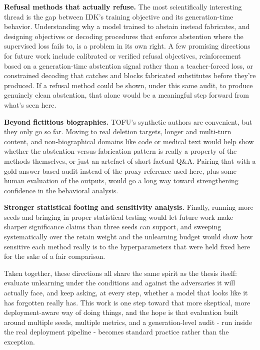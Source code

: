 \documentclass[a4paper,12pt]{report}
\begin{document}
\textbf{Refusal methods that actually refuse.} The most scientifically interesting thread is the gap between IDK's training objective and its generation-time behavior. Understanding why a model trained to abstain instead fabricates, and designing objectives or decoding procedures that enforce abstention where the supervised loss fails to, is a problem in its own right. A few promising directions for future work include calibrated or verified refusal objectives, reinforcement based on a generation-time abstention signal rather than a teacher-forced loss, or constrained decoding that catches and blocks fabricated substitutes before they're produced. If a refusal method could be shown, under this same audit, to produce genuinely clean abstention, that alone would be a meaningful step forward from what's seen here.

\textbf{Beyond fictitious biographies.} TOFU's synthetic authors are convenient, but they only go so far. Moving to real deletion targets, longer and multi-turn content, and non-biographical domains like code or medical text would help show whether the abstention-versus-fabrication pattern is really a property of the methods themselves, or just an artefact of short factual Q\&A. Pairing that with a gold-answer-based audit instead of the proxy reference used here, plus some human evaluation of the outputs, would go a long way toward strengthening confidence in the behavioral analysis.

\textbf{Stronger statistical footing and sensitivity analysis.} Finally, running more seeds and bringing in proper statistical testing would let future work make sharper significance claims than three seeds can support, and sweeping systematically over the retain weight and the unlearning budget would show how sensitive each method really is to the hyperparameters that were held fixed here for the sake of a fair comparison.

Taken together, these directions all share the same spirit as the thesis itself: evaluate unlearning under the conditions and against the adversaries it will actually face, and keep asking, at every step, whether a model that looks like it has forgotten really has. This work is one step toward that more skeptical, more deployment-aware way of doing things, and the hope is that evaluation built around multiple seeds, multiple metrics, and a generation-level audit - run inside the real deployment pipeline - becomes standard practice rather than the exception.

\appendix
\end{document}
